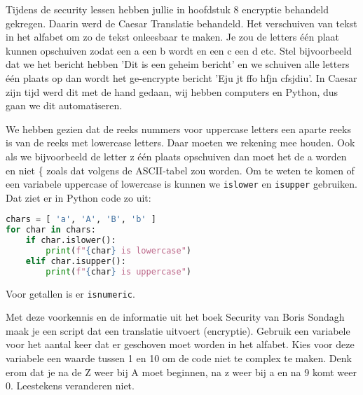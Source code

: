 Tijdens de security lessen hebben jullie in hoofdstuk 8 encryptie behandeld gekregen. Daarin werd de Caesar Translatie behandeld. Het verschuiven van tekst in het alfabet om zo de tekst onleesbaar te maken. Je zou de letters \'e\'en plaat kunnen opschuiven zodat een a een b wordt en een c een d etc. Stel bijvoorbeeld dat we het bericht hebben 'Dit is een geheim bericht' en we schuiven alle letters \'e\'en plaats op dan wordt het ge-encrypte bericht 'Eju jt ffo hfjn cfsjdiu'. In Caesar zijn tijd werd dit met de hand gedaan, wij hebben computers en Python, dus gaan we dit automatiseren.

We hebben gezien dat de reeks nummers voor uppercase letters een aparte reeks is van de reeks met lowercase letters. Daar moeten we rekening mee houden. Ook als we bijvoorbeeld de letter z \'e\'en plaats opschuiven dan moet het de a worden en niet \{ zoals dat volgens de ASCII-tabel zou worden. Om te weten te komen of een variabele uppercase of lowercase is kunnen we \texttt{islower} en \texttt{isupper} gebruiken. Dat ziet er in Python code zo uit:
\begin{lstlisting}[language=python]
chars = [ 'a', 'A', 'B', 'b' ]
for char in chars:
    if char.islower():
        print(f"{char} is lowercase")
    elif char.isupper():
        print(f"{char} is uppercase")
\end{lstlisting}
Voor getallen is er \texttt{isnumeric}.

Met deze voorkennis en de informatie uit het boek Security van Boris Sondagh maak je een script dat een translatie uitvoert (encryptie). Gebruik een variabele voor het aantal keer dat er geschoven moet worden in het alfabet. Kies voor deze variabele een waarde tussen 1 en 10 om de code niet te complex te maken. Denk erom dat je na de Z weer bij A moet beginnen, na z weer bij a en na 9 komt weer 0. Leestekens veranderen niet.
